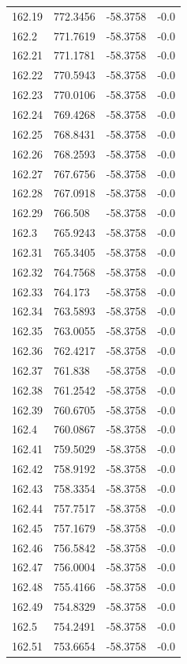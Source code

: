 \begin{table}[H]
\begin{tabular}{llll}
162.19 & 772.3456 & -58.3758 & -0.0 \\
162.2 & 771.7619 & -58.3758 & -0.0 \\
162.21 & 771.1781 & -58.3758 & -0.0 \\
162.22 & 770.5943 & -58.3758 & -0.0 \\
162.23 & 770.0106 & -58.3758 & -0.0 \\
162.24 & 769.4268 & -58.3758 & -0.0 \\
162.25 & 768.8431 & -58.3758 & -0.0 \\
162.26 & 768.2593 & -58.3758 & -0.0 \\
162.27 & 767.6756 & -58.3758 & -0.0 \\
162.28 & 767.0918 & -58.3758 & -0.0 \\
162.29 & 766.508 & -58.3758 & -0.0 \\
162.3 & 765.9243 & -58.3758 & -0.0 \\
162.31 & 765.3405 & -58.3758 & -0.0 \\
162.32 & 764.7568 & -58.3758 & -0.0 \\
162.33 & 764.173 & -58.3758 & -0.0 \\
162.34 & 763.5893 & -58.3758 & -0.0 \\
162.35 & 763.0055 & -58.3758 & -0.0 \\
162.36 & 762.4217 & -58.3758 & -0.0 \\
162.37 & 761.838 & -58.3758 & -0.0 \\
162.38 & 761.2542 & -58.3758 & -0.0 \\
162.39 & 760.6705 & -58.3758 & -0.0 \\
162.4 & 760.0867 & -58.3758 & -0.0 \\
162.41 & 759.5029 & -58.3758 & -0.0 \\
162.42 & 758.9192 & -58.3758 & -0.0 \\
162.43 & 758.3354 & -58.3758 & -0.0 \\
162.44 & 757.7517 & -58.3758 & -0.0 \\
162.45 & 757.1679 & -58.3758 & -0.0 \\
162.46 & 756.5842 & -58.3758 & -0.0 \\
162.47 & 756.0004 & -58.3758 & -0.0 \\
162.48 & 755.4166 & -58.3758 & -0.0 \\
162.49 & 754.8329 & -58.3758 & -0.0 \\
162.5 & 754.2491 & -58.3758 & -0.0 \\
162.51 & 753.6654 & -58.3758 & -0.0 \\

\end{tabular}
\end{table}
